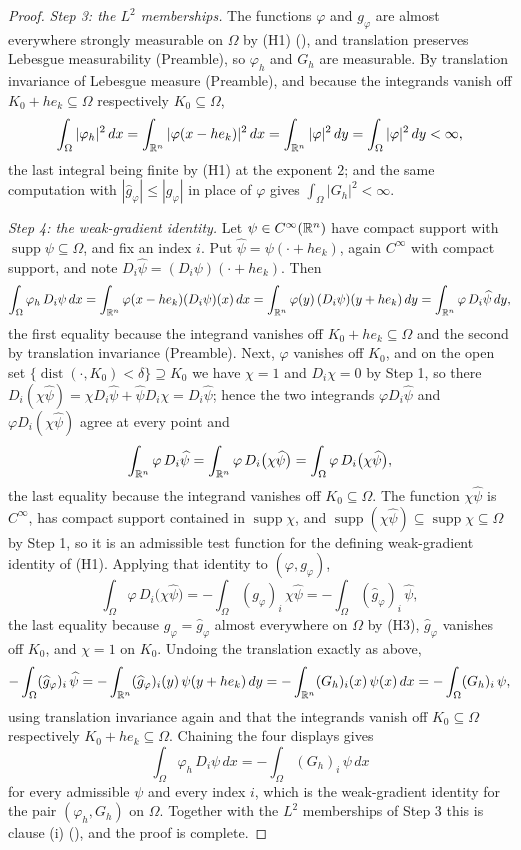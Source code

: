 \begin{proof}
\emph{Step 3: the $L^2$ memberships.}  The functions $\varphi$ and $g_\varphi$
are almost everywhere strongly measurable on $\Omega$ by (H1)
(), and translation preserves Lebesgue measurability
(Preamble), so $\varphi_h$ and $G_h$ are measurable.  By translation invariance
of Lebesgue measure (Preamble), and because the integrands vanish off
$K_0+he_k\subseteq\Omega$ respectively $K_0\subseteq\Omega$,
\[
\int_\Omega|\varphi_h|^2\,dx=\int_{\mathbb{R}^n}|\varphi(x-he_k)|^2\,dx
=\int_{\mathbb{R}^n}|\varphi|^2\,dy=\int_\Omega|\varphi|^2\,dy<\infty,
\]
the last integral being finite by (H1) at the exponent $2$; and the same
computation with $|\widehat g_\varphi|\le|g_\varphi|$ in place of $\varphi$
gives $\int_\Omega|G_h|^2<\infty$.

\emph{Step 4: the weak-gradient identity.}  Let $\psi\in C^\infty(\mathbb{R}^n)$ have
compact support with $\operatorname{supp}\psi\subseteq\Omega$, and fix an index
$i$.  Put $\widehat\psi=\psi(\cdot+he_k)$, again $C^\infty$ with compact
support, and note $D_i\widehat\psi=(D_i\psi)(\cdot+he_k)$.  Then
\[
\int_\Omega\varphi_h\,D_i\psi\,dx
=\int_{\mathbb{R}^n}\varphi(x-he_k)(D_i\psi)(x)\,dx
=\int_{\mathbb{R}^n}\varphi(y)\,(D_i\psi)(y+he_k)\,dy
=\int_{\mathbb{R}^n}\varphi\,D_i\widehat\psi\,dy ,
\]
the first equality because the integrand vanishes off $K_0+he_k\subseteq\Omega$
and the second by translation invariance (Preamble).  Next, $\varphi$ vanishes
off $K_0$, and on the open set $\{\operatorname{dist}(\cdot,K_0)<\delta\}
\supseteq K_0$ we have $\chi=1$ and $D_i\chi=0$ by Step 1, so there
$D_i(\chi\widehat\psi)=\chi D_i\widehat\psi+\widehat\psi D_i\chi
=D_i\widehat\psi$; hence the two integrands $\varphi D_i\widehat\psi$ and
$\varphi D_i(\chi\widehat\psi)$ agree at every point and
\[
\int_{\mathbb{R}^n}\varphi\,D_i\widehat\psi
=\int_{\mathbb{R}^n}\varphi\,D_i\bigl(\chi\widehat\psi\bigr)
=\int_\Omega\varphi\,D_i\bigl(\chi\widehat\psi\bigr) ,
\]
the last equality because the integrand vanishes off $K_0\subseteq\Omega$.  The
function $\chi\widehat\psi$ is $C^\infty$, has compact support contained in
$\operatorname{supp}\chi$, and
$\operatorname{supp}(\chi\widehat\psi)\subseteq\operatorname{supp}\chi
\subseteq\Omega$ by Step 1, so it is an admissible test function for the
defining weak-gradient identity of (H1).  Applying that identity to
$(\varphi,g_\varphi)$,
\[
\int_\Omega\varphi\,D_i\bigl(\chi\widehat\psi\bigr)
=-\int_\Omega(g_\varphi)_i\,\chi\widehat\psi
=-\int_\Omega(\widehat g_\varphi)_i\,\widehat\psi ,
\]
the last equality because $g_\varphi=\widehat g_\varphi$ almost everywhere on
$\Omega$ by (H3), $\widehat g_\varphi$ vanishes off $K_0$, and $\chi=1$ on
$K_0$.  Undoing the translation exactly as above,
\[
-\int_\Omega(\widehat g_\varphi)_i\,\widehat\psi
=-\int_{\mathbb{R}^n}(\widehat g_\varphi)_i(y)\,\psi(y+he_k)\,dy
=-\int_{\mathbb{R}^n}(G_h)_i(x)\,\psi(x)\,dx
=-\int_\Omega(G_h)_i\,\psi ,
\]
using translation invariance again and that the integrands vanish off
$K_0\subseteq\Omega$ respectively $K_0+he_k\subseteq\Omega$.  Chaining the four
displays gives
\[
\int_\Omega\varphi_h\,D_i\psi\,dx=-\int_\Omega(G_h)_i\,\psi\,dx
\]
for every admissible $\psi$ and every index $i$, which is the weak-gradient
identity for the pair $(\varphi_h,G_h)$ on $\Omega$.  Together with the $L^2$
memberships of Step 3 this is clause (i) (), and the proof is
complete.
\end{proof}
